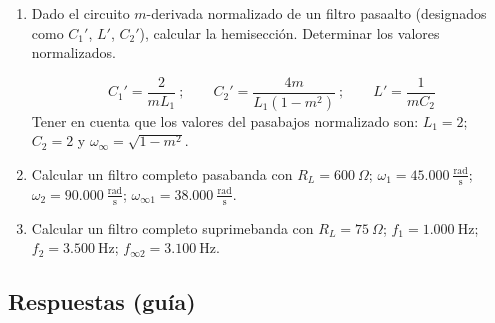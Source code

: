 \documentclass[class=article, crop=false, oneside]{standalone}
\begin{document}
\begin{enumerate}
    \item Dado el circuito $m$-derivada normalizado de un filtro pasaalto
    (designados como $C_1'$, $L'$, $C_2'$), calcular la hemisección. Determinar
    los valores normalizados.
    \begin{figure}[H]
        \centering
        
    \end{figure}
    \begin{equation*}
        C_1' = \frac{2}{m L_1}\ ;\qquad
        C_2' = \frac{4m}{L_1(1-m^2)}\ ;\qquad
        L' = \frac{1}{m C_2}
    \end{equation*}
    Tener en cuenta que los valores del pasabajos normalizado son:
    $L_1 = 2$; $C_2 = 2$ y $\omega_\infty = \sqrt{1-m^2}$.

    \item Calcular un filtro completo pasabanda con $R_L = 600\ \Omega$;
    $\omega_1 = 45.000\ \tfrac{\text{rad}}{\text{s}}$;
    $\omega_2 = 90.000\ \tfrac{\text{rad}}{\text{s}}$;
    $\omega_{\infty 1} = 38.000\ \tfrac{\text{rad}}{\text{s}}$.

    \item Calcular un filtro completo suprimebanda con $R_L = 75\ \Omega$;
    $f_1 = 1.000\ \text{Hz}$; $f_2 = 3.500\ \text{Hz}$; $f_{\infty 2} = 3.100\ \text{Hz}$.
\end{enumerate}

\subsection*{Respuestas (guía)}
\end{document}
